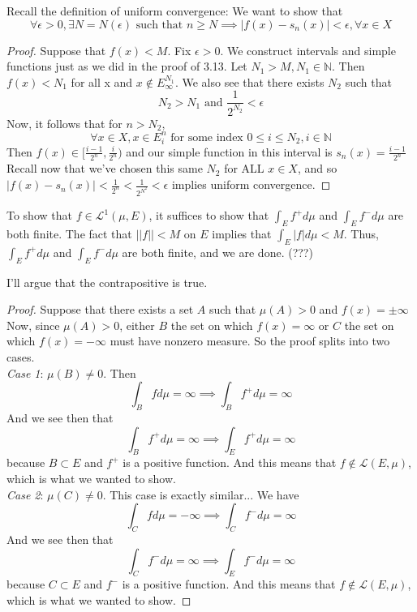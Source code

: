 \documentclass[12pt]{article}
\newenvironment{problem}[2][Problem]{\begin{trivlist}
\item[\hskip \labelsep {\bfseries #1}\hskip \labelsep {\bfseries #2.}]}{\end{trivlist}}
\theoremstyle{definition}
\theoremstyle{definition}
\theoremstyle{definition}
\theoremstyle{definition}
\begin{document}
\begin{problem}{3.14}
Recall the definition of uniform convergence: We want to show that 
$$ \forall \epsilon > 0, \exists N=N(\epsilon) \text{ such that } n \geq N \implies |f(x)-s_n(x)| < \epsilon, \forall x \in X$$
\begin{proof}
Suppose that $f(x) < M$. Fix $\epsilon > 0$. We construct intervals and simple functions just as we did in the proof of 3.13. Let $N_1 > M, N_1 \in \mathbb{N}$. Then $f(x) < N_1 $ for all x and $x \notin E_\infty^{N_1}$. We also see that there exists $N_2$ such that 
$$
N_2 > N_1 \text{ and } \frac{1}{2^{N_2}} < \epsilon
$$
Now, it follows that for $n>N_2$,  
$$
\forall x \in X, x \in E_i^n \text{ for some index } 0 \leq i \leq N_2, i \in \mathbb{N}
$$
Then $f(x) \in [\frac{i-1}{2^n}, \frac{i}{2^n}) $ and our simple function in this interval is $s_n(x) = \frac{i-1}{2^n} $ Recall now that we've chosen this same $N_2$ for ALL $x \in X$, and so $|f(x) - s_n(x)| < \frac{1}{2^n} < \frac{1}{2^{N^2}} < \epsilon $ implies uniform convergence.
\end{proof}
\end{problem}
\begin{problem}{4.13}
To show that $f \in \mathcal{L}^1(\mu, E)$, it suffices to show that $\int_Ef^+d\mu$ and $\int_Ef^-d\mu$ are both finite. The fact that $||f|| < M$ on $E$ implies that $\int_E|f|d\mu < M$. Thus, $\int_Ef^+d\mu$ and $\int_Ef^-d\mu$ are both finite, and we are done. (???)
\end{problem}
\begin{problem}{4.14}
I'll argue that the contrapositive is true.
\begin{proof}
Suppose that there exists a set $A$ such that $\mu(A)>0$ and $f(x) = \pm \infty$ Now, since $\mu(A) > 0$, either $B$ the set on which $f(x)=\infty$ or $C$ the set on which $f(x) =-\infty$ must have nonzero measure. So the proof splits into two cases. \\
\textit{Case 1}: $\mu(B) \neq 0$. Then 
$$\int_B fd\mu = \infty \implies \int_Bf^+d\mu = \infty $$ 
And we see then that 
$$\int_B f^+d\mu = \infty \implies \int_E f^+d\mu = \infty $$ 
because $B \subset E$ and $f^+$ is a positive function. And this means that $f \notin \mathcal{L}(E, \mu)$, which is what we wanted to show.\\
\textit{Case 2}: $\mu(C) \neq 0$. This case is exactly similar... We have
$$\int_C fd\mu = -\infty \implies \int_Cf^-d\mu = \infty $$ 
And we see then that 
$$\int_C f^-d\mu = \infty \implies \int_E f^-d\mu = \infty $$ 
because $C \subset E$ and $f^-$ is a positive function. And this means that $f \notin \mathcal{L}(E, \mu)$, which is what we wanted to show.
\end{proof}
\end{problem}
\end{document}
